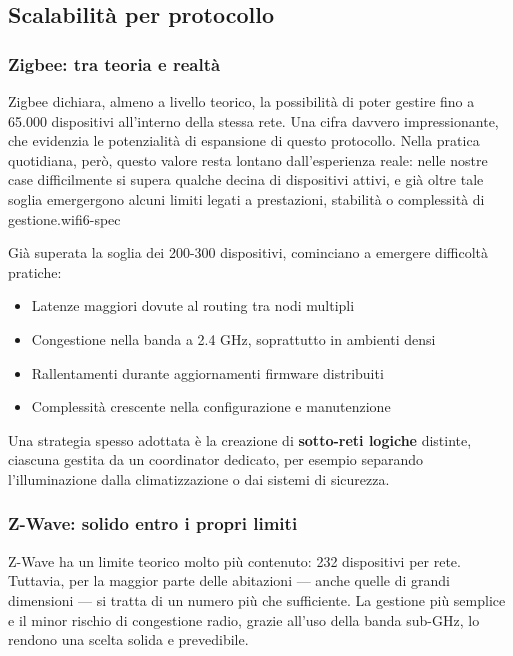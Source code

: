 \subsection{Scalabilità per protocollo}

\subsubsection{Zigbee: tra teoria e realtà}

Zigbee dichiara, almeno a livello teorico, la possibilità di poter gestire fino a 65.000 dispositivi all’interno della stessa rete. Una cifra davvero impressionante, che evidenzia le potenzialità di espansione di questo protocollo. Nella pratica quotidiana, però, questo valore resta lontano dall’esperienza reale: nelle nostre case difficilmente si supera qualche decina di dispositivi attivi, e già oltre tale soglia emergergono alcuni limiti legati a prestazioni, stabilità o complessità di gestione.wifi6-spec


Già superata la soglia dei 200-300 dispositivi, cominciano a emergere difficoltà pratiche:
\begin{itemize}
    \item Latenze maggiori dovute al routing tra nodi multipli
    \item Congestione nella banda a 2.4 GHz, soprattutto in ambienti densi
    \item Rallentamenti durante aggiornamenti firmware distribuiti
    \item Complessità crescente nella configurazione e manutenzione
\end{itemize}

Una strategia spesso adottata è la creazione di \textbf{sotto-reti logiche} distinte, ciascuna gestita da un coordinator dedicato, per esempio separando l’illuminazione dalla climatizzazione o dai sistemi di sicurezza.

\subsubsection{Z-Wave: solido entro i propri limiti}

Z-Wave ha un limite teorico molto più contenuto: 232 dispositivi per rete. Tuttavia, per la maggior parte delle abitazioni — anche quelle di grandi dimensioni — si tratta di un numero più che sufficiente. La gestione più semplice e il minor rischio di congestione radio, grazie all’uso della banda sub-GHz, lo rendono una scelta solida e prevedibile.

